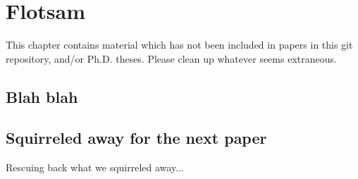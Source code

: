 %




\chapter{Flotsam}

This chapter contains material which has not been included in papers
 in this git repository,  and/or
Ph.D. theses. Please clean up whatever seems
extraneous.

\section{Blah blah}
    \label{s:exampleIntro}



\section{Squirreled away for the next paper}

Rescuing back what we squirreled away...
